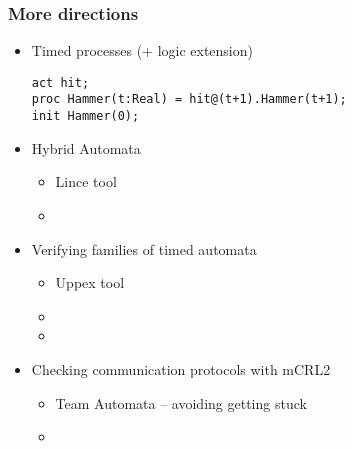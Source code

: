 \documentclass[aspectratio=169]{beamer}
\begin{document}
\begin{frame}[fragile]\frametitle{More directions}
    
   \begin{itemize}
     \item Timed processes (+ logic extension)
\begin{lstlisting}[moreemph={act,init},morekeywords={Hammer}]
act hit;
proc Hammer(t:Real) = hit@(t+1).Hammer(t+1);
init Hammer(0);
\end{lstlisting}

     \item Hybrid Automata
     \begin{itemize}
       \item Lince tool
       \item {}
     \end{itemize}

     \item Verifying families of timed automata
     \begin{itemize}
       \item Uppex tool
       \item {}
       \item {}
     \end{itemize}

     \item Checking communication protocols with mCRL2
     \begin{itemize}
       \item Team Automata -- avoiding getting stuck
       \item {}
     \end{itemize}
   \end{itemize}

\end{frame}
\end{document}
